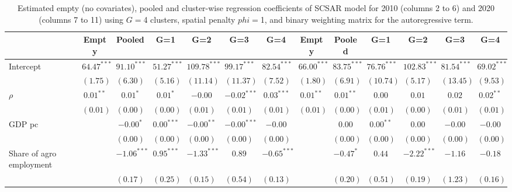 
\begin{table}
\caption{Estimated empty (no covariates), pooled and cluster-wise regression coefficients of SCSAR model for 2010 (columns 2 to 6) and 2020 (columns 7 to 11) using $G=$4 clusters, spatial penalty $phi=$1, and binary weighting matrix for the autoregressive term.}
\begin{center}
\begin{tabular}{l c c c c c c c c c c c c}
\hline
 & Empty & Pooled & G=1 & G=2 & G=3 & G=4 & Empty & Pooled & G=1 & G=2 & G=3 & G=4 \\
\hline
Intercept                         & $64.47^{***}$ & $91.10^{***}$ & $51.27^{***}$ & $109.78^{***}$ & $99.17^{***}$ & $82.54^{***}$ & $66.00^{***}$ & $83.75^{***}$ & $76.76^{***}$ & $102.83^{***}$ & $81.54^{***}$ & $69.02^{***}$ \\
                                  & $(1.75)$      & $(6.30)$      & $(5.16)$      & $(11.14)$      & $(11.37)$     & $(7.52)$      & $(1.80)$      & $(6.91)$      & $(10.74)$     & $(5.17)$       & $(13.45)$     & $(9.53)$      \\
$\rho$                            & $0.01^{**}$   & $0.01^{*}$    & $0.01^{*}$    & $-0.00$        & $-0.02^{***}$ & $0.03^{***}$  & $0.01^{**}$   & $0.01^{**}$   & $0.00$        & $0.01$         & $0.02$        & $0.02^{**}$   \\
                                  & $(0.01)$      & $(0.00)$      & $(0.00)$      & $(0.01)$       & $(0.01)$      & $(0.01)$      & $(0.01)$      & $(0.00)$      & $(0.01)$      & $(0.00)$       & $(0.01)$      & $(0.01)$      \\
GDP pc                            &               & $-0.00^{*}$   & $0.00^{***}$  & $-0.00^{**}$   & $-0.00^{***}$ & $-0.00$       &               & $0.00$        & $0.00^{**}$   & $0.00$         & $-0.00$       & $-0.00$       \\
                                  &               & $(0.00)$      & $(0.00)$      & $(0.00)$       & $(0.00)$      & $(0.00)$      &               & $(0.00)$      & $(0.00)$      & $(0.00)$       & $(0.00)$      & $(0.00)$      \\
Share of agro employment          &               & $-1.06^{***}$ & $0.95^{***}$  & $-1.33^{***}$  & $0.89$        & $-0.65^{***}$ &               & $-0.47^{*}$   & $0.44$        & $-2.22^{***}$  & $-1.16$       & $-0.18$       \\
                                  &               & $(0.17)$      & $(0.25)$      & $(0.15)$       & $(0.54)$      & $(0.13)$      &               & $(0.20)$      & $(0.51)$      & $(0.19)$       & $(1.23)$      & $(0.16)$      \\

\end{tabular}
\end{center}
\end{table}
